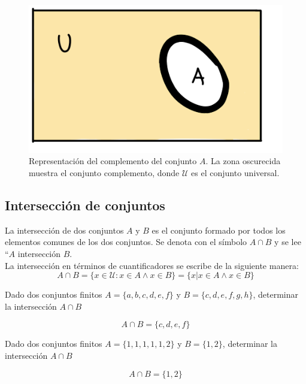 \begin{center}
	\begin{figure}[ht!]
	\centering
    		\includegraphics[scale=0.38]{FiguresBM/complemento.png}
    		\caption[Representación del complemento del conjunto $A$]{Representación del complemento del conjunto $A$. La zona oscurecida muestra el conjunto complemento, donde $\mathcal{U}$ es el conjunto universal.}
	\end{figure}
\end{center}

\subsection{Intersección de conjuntos }
La intersección de dos conjuntos $A$ y $B$ es el conjunto formado por todos los elementos comunes de los dos conjuntos. Se denota con el símbolo $A\cap B$ y se lee ``$A$ intersección $B$.\\
La intersección en términos de cuantificadores se escribe de la siguiente manera:\\
\begin{equation}
A\cap B=\{x\in\mathcal{U}:x\in A\wedge x\in B\}=\{x|x\in A\wedge x\in B\}
\end{equation} 

\begin{myexample}
Dado dos conjuntos finitos $A=\{a,b,c,d,e,f\}$ y $B=\{c,d,e,f,g,h\}$, determinar la intersección $A\cap B$
\end{myexample}
\begin{equation*}
A\cap B=\{c,d,e,f\}
\end{equation*}
\begin{myexample}
Dado dos conjuntos finitos $A=\{1,1,1,1,1,2\}$ y $B=\{1,2\}$, determinar la intersección $A\cap B$
\end{myexample}
\begin{equation*}
A\cap B=\{1,2\}
\end{equation*}

